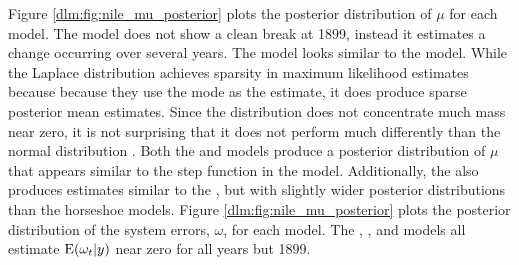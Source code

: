 \documentclass[12pt]{article}
\begin{document}
Figure \ref{dlm:fig:nile_mu_posterior} plots the posterior distribution of $\mu$ for each model.
The  model does not show a clean break at 1899, instead it estimates a change occurring over several years.
The  model looks similar to the  model.
While the Laplace distribution achieves sparsity in maximum likelihood estimates because because they use the mode as the estimate, it does produce sparse posterior mean estimates.
Since the distribution does not concentrate much mass near zero, it is not surprising that it does not perform much differently than the normal distribution \parencites{ParkCasella2008}.
Both the  and  models produce a posterior distribution of $\mu$ that appears similar to the step function in the  model.
Additionally, the  also produces estimates similar to the , but with slightly wider posterior distributions than the horseshoe models.
Figure \ref{dlm:fig:nile_mu_posterior} plots the posterior distribution of the system errors, $\omega$, for each model.
The , , and  models all estimate $\operatorname{E}(\omega_{t} | y)$ near zero for all years but 1899.
\end{document}
